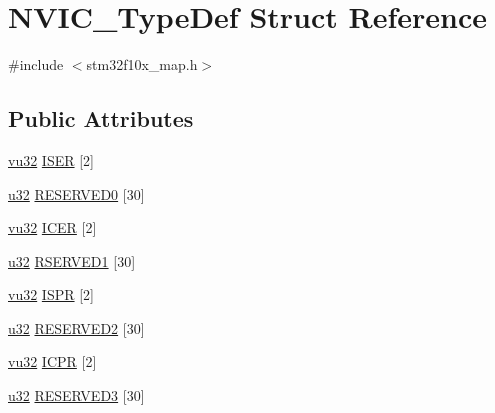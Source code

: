 \hypertarget{struct_n_v_i_c___type_def}{}\section{N\+V\+I\+C\+\_\+\+Type\+Def Struct Reference}
\label{struct_n_v_i_c___type_def}


{\ttfamily \#include $<$stm32f10x\+\_\+map.\+h$>$}

\subsection*{Public Attributes}
\begin{DoxyCompactItemize}
\item 
\hyperlink{agilefox_2library_2inc_2stm32f10x__type_8h_a6e2761f0a1011f84ed96b946f2c8a563}{vu32} \hyperlink{struct_n_v_i_c___type_def_a38dbc793122fe4e943522de96d289292}{I\+S\+ER} \mbox{[}2\mbox{]}
\item 
\hyperlink{agilefox_2library_2inc_2stm32f10x__type_8h_a2caf5cd7bcdbe1eefa727f44ffb10bac}{u32} \hyperlink{struct_n_v_i_c___type_def_a3747e6321d53cb6238f757dba217c5fb}{R\+E\+S\+E\+R\+V\+E\+D0} \mbox{[}30\mbox{]}
\item 
\hyperlink{agilefox_2library_2inc_2stm32f10x__type_8h_a6e2761f0a1011f84ed96b946f2c8a563}{vu32} \hyperlink{struct_n_v_i_c___type_def_a9805a9bbff34c3e917a99304fa7d9e74}{I\+C\+ER} \mbox{[}2\mbox{]}
\item 
\hyperlink{agilefox_2library_2inc_2stm32f10x__type_8h_a2caf5cd7bcdbe1eefa727f44ffb10bac}{u32} \hyperlink{struct_n_v_i_c___type_def_a785e7e48ac18c752307c4b5c09bd8ddb}{R\+S\+E\+R\+V\+E\+D1} \mbox{[}30\mbox{]}
\item 
\hyperlink{agilefox_2library_2inc_2stm32f10x__type_8h_a6e2761f0a1011f84ed96b946f2c8a563}{vu32} \hyperlink{struct_n_v_i_c___type_def_a8722eeb170cc4c0e3bc49a167060a2d9}{I\+S\+PR} \mbox{[}2\mbox{]}
\item 
\hyperlink{agilefox_2library_2inc_2stm32f10x__type_8h_a2caf5cd7bcdbe1eefa727f44ffb10bac}{u32} \hyperlink{struct_n_v_i_c___type_def_ae42aff2d808aa13271e5176c4bfe8dc6}{R\+E\+S\+E\+R\+V\+E\+D2} \mbox{[}30\mbox{]}
\item 
\hyperlink{agilefox_2library_2inc_2stm32f10x__type_8h_a6e2761f0a1011f84ed96b946f2c8a563}{vu32} \hyperlink{struct_n_v_i_c___type_def_a5ab796b9897db828c821595afce3bb62}{I\+C\+PR} \mbox{[}2\mbox{]}
\item 
\hyperlink{agilefox_2library_2inc_2stm32f10x__type_8h_a2caf5cd7bcdbe1eefa727f44ffb10bac}{u32} \hyperlink{struct_n_v_i_c___type_def_ab9ad46e0a62dad26e881bcdd9d21c07a}{R\+E\+S\+E\+R\+V\+E\+D3} \mbox{[}30\mbox{]}

\end{DoxyCompactItemize}
